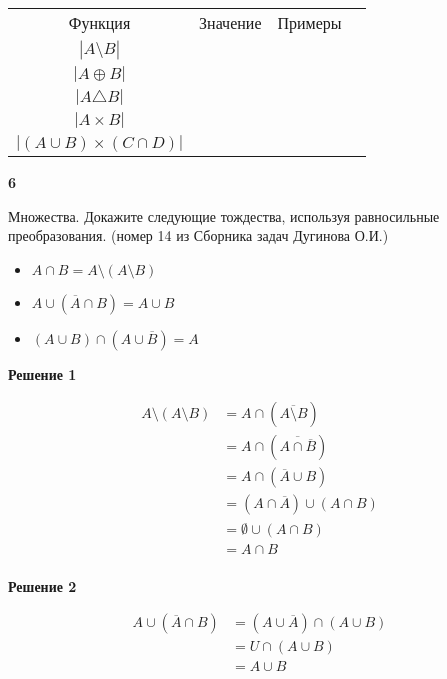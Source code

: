 \documentclass{article}
\begin{document}
\begin{center}
\begin{tabular}{ c c c c }
  Функция & Значение & Примеры \\
  $|A \setminus B|$ &  & \\
  $| A \oplus B|$ &  & \\
  $| A \triangle B|$ &  & \\
  $| A \times B|$ &  & \\
  $| (A \cup B) \times (C \cap D)|$ &  & \\
\end{tabular}
\end{center}


\textbf{6} 

Множества. Докажите следующие тождества, используя равносильные преобразования. (номер 14 из Сборника задач Дугинова О.И.)

\begin{itemize}
    \item $A \cap B = A \setminus (A \setminus B)$
    \item $A \cup (\overline{A} \cap B) = A \cup B$
    \item $(A \cup B) \cap (A \cup \overline{B}) = A$
\end{itemize}

\textbf{Решение 1}

\begin{equation} 
\begin{split}
A \setminus (A \setminus B) 
& = A \cap (\overline{A \setminus B}) \\
& = A \cap (\overline{A \cap \overline{B} }) \\
& = A \cap (\overline{A} \cup B ) \\
& = (A \cap \overline{A}) \cup (A \cap B ) \\
& = \emptyset \cup (A \cap B ) \\
& = A \cap B  \\
\end{split}
\end{equation}


\textbf{Решение 2}

\begin{equation} 
\begin{split}
A \cup (\overline{A} \cap B) 
& = (A \cup \overline{A}) \cap (A \cup B) \\
& = U \cap (A \cup B) \\
& = A \cup B \\
\end{split}
\end{equation}
\end{document}
